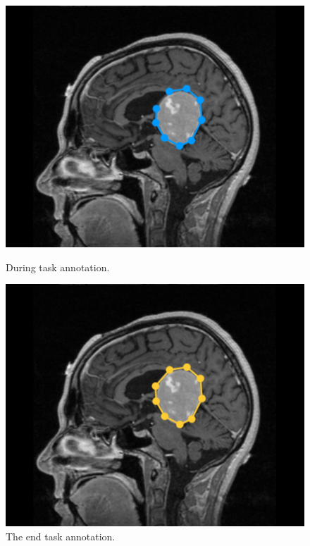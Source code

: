 \documentclass{sigchi}
\begin{document}
\begin{figure}[!tbp]
  \centering
  \begin{minipage}[b]{0.2\textwidth}
    \includegraphics[width=\textwidth]{screen2}
    \caption{During task annotation.}
    \label{fig:non_finish_annot}
  \end{minipage}
  \hfill
  \begin{minipage}[b]{0.2\textwidth}
    \includegraphics[width=\textwidth]{screen3}
    \caption{The end task annotation.}
    \label{fig:finish_annot}
  \end{minipage}
\end{figure}
\end{document}
